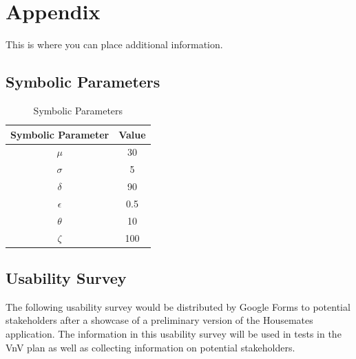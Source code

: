 \documentclass[12pt, titlepage]{article}
\begin{document}
% 

% 

\newpage

\section{Appendix}

This is where you can place additional information.

\subsection{Symbolic Parameters}

\begin{table}[H]
    \centering
    \begin{tabular}{|c|c|}
    \hline
        Symbolic Parameter & Value \\ \hline
        $\mu$ & 30 \\
        $\sigma$ & 5  \\
        $\delta$ & 90  \\
        $\epsilon$ & 0.5 \\
        $\theta$ & 10 \\
        $\zeta$ & 100 \\
         \hline
    \end{tabular}
    \caption{Symbolic Parameters}
    \label{tab:my_label}
\end{table}



\subsection{Usability Survey}

The following usability survey would be distributed by Google Forms to potential stakeholders after a showcase of a preliminary version of the Housemates application. The information in this usability survey will be used in tests in the VnV plan as well as collecting information on potential stakeholders.
\end{document}
